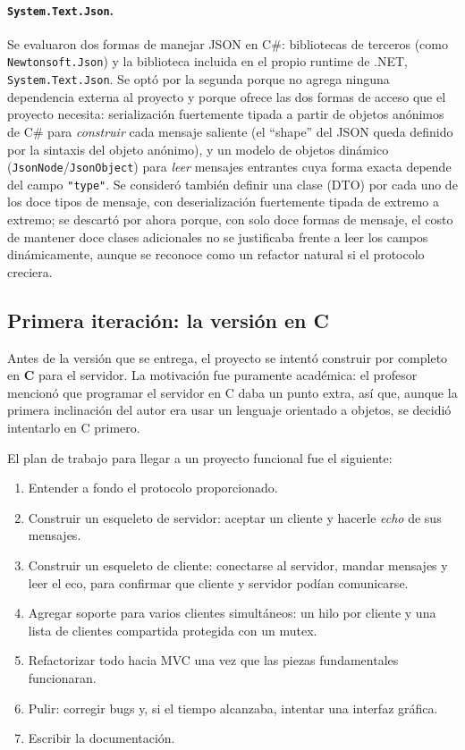\documentclass[11pt,letterpaper]{article}
\begin{document}
\paragraph{\texttt{System.Text.Json}.} Se evaluaron dos formas de manejar
JSON en C\#: bibliotecas de terceros (como \texttt{Newtonsoft.Json}) y la
biblioteca incluida en el propio runtime de .NET,
\texttt{System.Text.Json}. Se optó por la segunda porque no agrega ninguna
dependencia externa al proyecto y porque ofrece las dos formas de acceso
que el proyecto necesita: serialización fuertemente tipada a partir de
objetos anónimos de C\# para \emph{construir} cada mensaje saliente (el
``shape'' del JSON queda definido por la sintaxis del objeto anónimo), y un
modelo de objetos dinámico (\texttt{JsonNode}/\texttt{JsonObject}) para
\emph{leer} mensajes entrantes cuya forma exacta depende del campo
\texttt{"type"}. Se consideró también definir una clase (DTO) por cada uno
de los doce tipos de mensaje, con deserialización fuertemente tipada de
extremo a extremo; se descartó por ahora porque, con solo doce formas de
mensaje, el costo de mantener doce clases adicionales no se justificaba
frente a leer los campos dinámicamente, aunque se reconoce como un
refactor natural si el protocolo creciera.

\subsection{Primera iteración: la versión en C}
\label{sec:primera-iteracion}

Antes de la versión que se entrega, el proyecto se intentó construir por
completo en \textbf{C} para el servidor. La motivación fue puramente
académica: el profesor mencionó que programar el servidor en C daba un
punto extra, así que, aunque la primera inclinación del autor era usar un
lenguaje orientado a objetos, se decidió intentarlo en C primero.

El plan de trabajo para llegar a un proyecto funcional fue el siguiente:

\begin{enumerate}[leftmargin=2.2em]
  \item Entender a fondo el protocolo proporcionado.
  \item Construir un esqueleto de servidor: aceptar un cliente y hacerle
        \emph{echo} de sus mensajes.
  \item Construir un esqueleto de cliente: conectarse al servidor, mandar
        mensajes y leer el eco, para confirmar que cliente y servidor
        podían comunicarse.
  \item Agregar soporte para varios clientes simultáneos: un hilo por
        cliente y una lista de clientes compartida protegida con un mutex.
  \item Refactorizar todo hacia MVC una vez que las piezas fundamentales
        funcionaran.
  \item Pulir: corregir bugs y, si el tiempo alcanzaba, intentar una
        interfaz gráfica.
  \item Escribir la documentación.
\end{enumerate}
\end{document}
